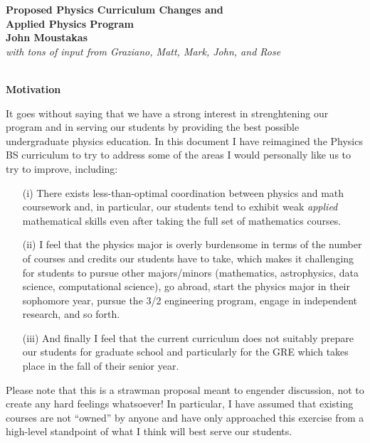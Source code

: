 \documentclass[12pt,preprint]{aastex}
\begin{document}
\vspace*{-1.2in} 
\begin{center}
{\Large {\bf\sc Proposed Physics Curriculum Changes and \\ Applied Physics
    Program}} \\ 
\vspace*{2mm} 
{\bf\sc John Moustakas} \\
{\em with tons of input from Graziano, Matt, Mark, John, and Rose} \\
\vspace*{2mm} 
 \\
\vspace*{0.1in} 
\end{center}

{\large \sc \textbf{Motivation}}


It goes without saying that we have a strong interest in strenghtening our
program and in serving our students by providing the best possible undergraduate
physics education.  In this document I have reimagined the Physics BS curriculum
to try to address some of the areas I would personally like us to try to
improve, including:
\begin{itemize}
  \item[(i)]{There exists less-than-optimal coordination between physics and
    math coursework and, in particular, our students tend to exhibit weak
    \emph{applied} mathematical skills even after taking the full set of
    mathematics courses.}
  \item[(ii)]{I feel that the physics major is overly burdensome in terms of the
    number of courses and credits our students have to take, which makes it
    challenging for students to pursue other majors/minors (mathematics,
    astrophysics, data science, computational science), go abroad, start the
    physics major in their sophomore year, pursue the 3/2 engineering program,
    engage in independent research, and so forth.}
  \item[(iii)]{And finally I feel that the current curriculum does not suitably
    prepare our students for graduate school and particularly for the GRE which
    takes place in the fall of their senior year.}
\end{itemize}
Please note that this is a strawman proposal meant to engender discussion, not
to create any hard feelings whatsoever!  In particular, I have assumed that
existing courses are not ``owned'' by anyone and have only approached this
exercise from a high-level standpoint of what I think will best serve our
students. 
\end{document}
